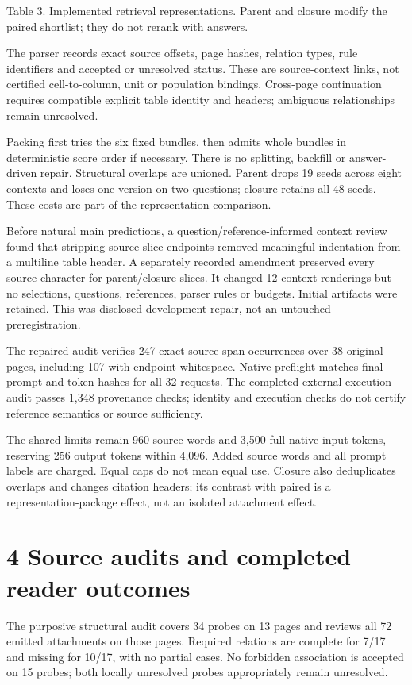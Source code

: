 \documentclass[11pt]{article}
\begin{document}
{\small Table 3. Implemented retrieval representations. Parent and closure modify the paired shortlist; they do not rerank with answers.}

The parser records exact source offsets, page hashes, relation types, rule identifiers and accepted or unresolved status. These are source-context links, not certified cell-to-column, unit or population bindings. Cross-page continuation requires compatible explicit table identity and headers; ambiguous relationships remain unresolved.


Packing first tries the six fixed bundles, then admits whole bundles in deterministic score order if necessary. There is no splitting, backfill or answer-driven repair. Structural overlaps are unioned. Parent drops 19 seeds across eight contexts and loses one version on two questions; closure retains all 48 seeds. These costs are part of the representation comparison.


Before natural main predictions, a question/reference-informed context review found that stripping source-slice endpoints removed meaningful indentation from a multiline table header. A separately recorded amendment preserved every source character for parent/closure slices. It changed 12 context renderings but no selections, questions, references, parser rules or budgets. Initial artifacts were retained. This was disclosed development repair, not an untouched preregistration.


The repaired audit verifies 247 exact source-span occurrences over 38 original pages, including 107 with endpoint whitespace. Native preflight matches final prompt and token hashes for all 32 requests. The completed external execution audit passes 1,348 provenance checks; identity and execution checks do not certify reference semantics or source sufficiency.


The shared limits remain 960 source words and 3,500 full native input tokens, reserving 256 output tokens within 4,096. Added source words and all prompt labels are charged. Equal caps do not mean equal use. Closure also deduplicates overlaps and changes citation headers; its contrast with paired is a representation-package effect, not an isolated attachment effect.


\section*{4  Source audits and completed reader outcomes}

The purposive structural audit covers 34 probes on 13 pages and reviews all 72 emitted attachments on those pages. Required relations are complete for 7/17 and missing for 10/17, with no partial cases. No forbidden association is accepted on 15 probes; both locally unresolved probes appropriately remain unresolved.
\end{document}
